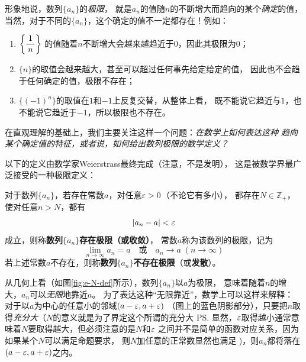 形象地说，数列$\{a_n\}$的{\it 极限}，
就是$a_n$的值随$n$的不断增大而趋向的某个{\it 确定}的值，
当然，对于不同的$\{a_n\}$，这个确定的值不一定都存在！例如：
\begin{enumerate}[(1)]
  \setlength{\itemindent}{1cm}
  \item $\left\{\displaystyle\frac{\,{1}\,}{\,{n}\,}\right\}$
  的值随着$n$不断增大会越来越趋近于$0$，因此其极限为$0$；
  \item $\{n\}$的取值会越来越大，甚至可以超过任何事先给定给定的值，
  因此也不会趋于任何确定的值，极限不存在；
  \item $\{(-1)^n\}$的取值在$1$和$-1$上反复交替，从整体上看，
  既不能说它趋近与$1$，也不能说它趋近于$-1$，所以极限也不存在。
\end{enumerate}

在直观理解的基础上，我们主要关注这样一个问题：{\it 在数学上如何表达这种
趋向某个确定值的特征，或者说，如何给出数列极限的数学定义？}

以下的定义由数学家Weierstrass最终完成（注意，不是发明），
这是被数学界最广泛接受的一种极限定义：

\begin{thx}
	对于数列$\{a_n\}$，若存在常数$a$，对任意$\varepsilon>0$（不论它有多小），
	都存在$N\in\mathbb{Z}_+$，使对任意$n>N$，都有
	$$|a_n-a|<\varepsilon$$
	成立，则称{\bf 数列$\{a_n\}$存在极限（或收敛）}，
	常数$a$称为该数列的极限，记为
	$$\lim_{n\to\infty}a_n=a\quad
	\mbox{或}\quad
	a_n\to a\;(n\to\infty)$$
	若上述常数$a$不存在，则称{\bf 数列$\{a_n\}$不存在极限}（或{\bf 发散}）。
\end{thx}

从几何上看（如图\ref{fig:e-N-def}所示），数列$\{a_n\}$以$a$为极限，
意味着随着$n$的增大，$a_n$可以{\it 无限}地靠近$a$。
为了表达这种“无限靠近”，数学上可以这样来解释：
对于以$a$为中心的任意小的邻域$(a-\varepsilon,a+\varepsilon)$
（图上的蓝色阴影部分），只要把$n$取得{\it 充分大}（$N$的意义就是为了界定这个所谓的充分大
\ps{显然，$\varepsilon$取得越小通常意味着$N$要取得越大，但必须注意的是$N$和$\varepsilon$
之间并不是简单的函数对应关系，因为如果某个$N$可以满足命题要求，
则$N$加任意的正常数显然也满足}
)，则$a_n$都将落在$(a-\varepsilon,a+\varepsilon)$之内。
	
